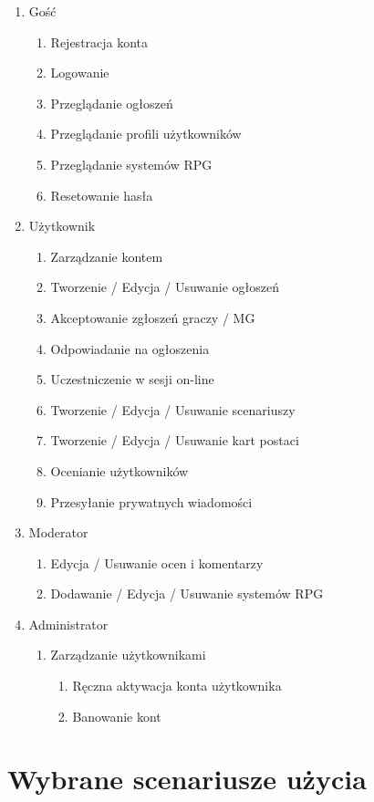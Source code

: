 \begin{enumerate}
\item Gość
	\begin{enumerate}
	\item Rejestracja konta
	\item Logowanie
	\item Przeglądanie ogłoszeń
	\item Przeglądanie profili użytkowników
	\item Przeglądanie systemów RPG
	\item Resetowanie hasła
	\end{enumerate}
\item Użytkownik
	\begin{enumerate}
	\item Zarządzanie kontem
	\item Tworzenie / Edycja / Usuwanie ogłoszeń
	\item Akceptowanie zgłoszeń graczy / MG
	\item Odpowiadanie na ogłoszenia
	\item Uczestniczenie w sesji on-line
	\item Tworzenie / Edycja / Usuwanie scenariuszy
	\item Tworzenie / Edycja / Usuwanie kart postaci
	\item Ocenianie użytkowników
	\item Przesyłanie prywatnych wiadomości
	\end{enumerate}
\item Moderator
	\begin{enumerate}
	\item Edycja / Usuwanie ocen i komentarzy
	\item Dodawanie / Edycja / Usuwanie systemów RPG
	\end{enumerate}
\item Administrator
	\begin{enumerate}
	\item Zarządzanie użytkownikami
		\begin{enumerate}
		\item Ręczna aktywacja konta użytkownika
		\item Banowanie kont
		\end{enumerate}
	\end{enumerate}
\end{enumerate}



\section{Wybrane scenariusze użycia}
\label{sec:scenariusze}

